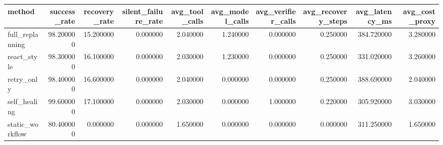 \begin{tabular}{lrrrrrrrrr}
\toprule
method & success_rate & recovery_rate & silent_failure_rate & avg_tool_calls & avg_model_calls & avg_verifier_calls & avg_recovery_steps & avg_latency_ms & avg_cost_proxy \\
\midrule
full_replanning & 98.200000 & 15.200000 & 0.000000 & 2.040000 & 1.240000 & 0.000000 & 0.250000 & 384.720000 & 3.280000 \\
react_style & 98.300000 & 16.100000 & 0.000000 & 2.030000 & 1.230000 & 0.000000 & 0.250000 & 331.020000 & 3.260000 \\
retry_only & 98.400000 & 16.600000 & 0.000000 & 2.040000 & 0.000000 & 0.000000 & 0.250000 & 388.690000 & 2.040000 \\
self_healing & 99.600000 & 17.100000 & 0.000000 & 2.030000 & 0.000000 & 1.000000 & 0.220000 & 305.920000 & 3.030000 \\
static_workflow & 80.400000 & 0.000000 & 0.000000 & 1.650000 & 0.000000 & 0.000000 & 0.000000 & 311.250000 & 1.650000 \\
\bottomrule
\end{tabular}
